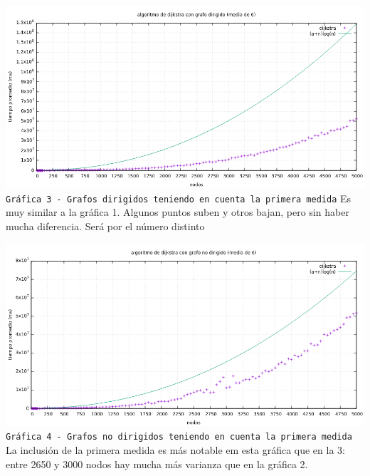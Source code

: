 \documentclass[12pt , a4paper]{article}
\begin{document}
	\newpage
	\hspace*{-.15\linewidth}
	\includegraphics[width=1.25\hsize]{dir6.png}
	\texttt{Gráfica 3 - Grafos dirigidos teniendo en cuenta la primera medida}
	Es muy similar a la gráfica 1. Algunos puntos suben y otros bajan, pero sin haber mucha diferencia. Será por el número distinto
	
	
	\newpage
	\hspace*{-.15\linewidth}
	\includegraphics[width=1.25\hsize]{nodir6.png}
	\texttt{Gráfica 4 - Grafos no dirigidos teniendo en cuenta la primera medida}
	La inclusión de la primera medida es más notable em esta gráfica que en la 3: entre 2650 y 3000 nodos hay mucha más varianza que en la gráfica 2. 
\end{document}
